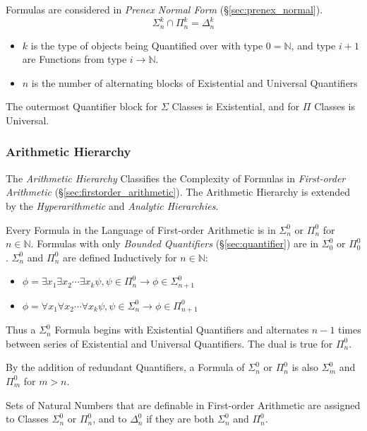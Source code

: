 Formulas are considered in \emph{Prenex Normal Form}
(\S\ref{sec:prenex_normal}).
\[
  \Sigma^k_n \cap \Pi^k_n = \Delta^k_n
\]
\begin{itemize}
  \item $k$ is the type of objects being Quantified over with type
    $0 = \mathbb{N}$, and type $i + 1$ are Functions from type $i
    \rightarrow \mathbb{N}$.
  \item $n$ is the number of alternating blocks of Existential and
    Universal Quantifiers
\end{itemize}
The outermost Quantifier block for $\Sigma$ Classes is Existential,
and for $\Pi$ Classes is Universal.



\subsubsection{Arithmetic Hierarchy}\label{sec:arithmetic_hierarchy}

The \emph{Arithmetic Hierarchy} Classifies the Complexity of Formulas
in \emph{First-order Arithmetic}
(\S\ref{sec:firstorder_arithmetic}). The Arithmetic Hierarchy is
extended by the \emph{Hyperarithmetic} and \emph{Analytic
  Hierarchies}.

Every Formula in the Language of First-order Arithmetic is in
$\Sigma^0_n$ or $\Pi^0_n$ for $n \in \mathbb{N}$. Formulas with only
\emph{Bounded Quantifiers} (\S\ref{sec:quantifier}) are in
$\Sigma^0_0$ or $\Pi^0_0$. $\Sigma^0_n$ and $\Pi^0_n$ are defined
Inductively for $n \in \mathbb{N}$:

\begin{itemize}
  \item $\phi = \exists x_1 \exists x_2 \cdots \exists x_k\psi, \psi
    \in \Pi^0_n \rightarrow \phi \in \Sigma^0_{n+1}$
  \item $\phi = \forall x_1 \forall x_2 \cdots \forall x_k\psi, \psi
    \in \Sigma^0_n \rightarrow \phi \in \Pi^0_{n+1}$
\end{itemize}

Thus a $\Sigma^0_n$ Formula begins with Existential Quantifiers and
alternates $n-1$ times between series of Existential and Universal
Quantifiers. The dual is true for $\Pi^0_n$.

By the addition of redundant Quantifiers, a Formula of $\Sigma^0_n$ or
$\Pi^0_n$ is also $\Sigma^0_m$ and $\Pi^0_m$ for $m > n$.

Sets of Natural Numbers that are definable in First-order Arithmetic
are assigned to Classes $\Sigma^0_n$ or $\Pi^0_n$, and to $\Delta^0_n$
if they are both $\Sigma^0_n$ and $\Pi^0_n$.

